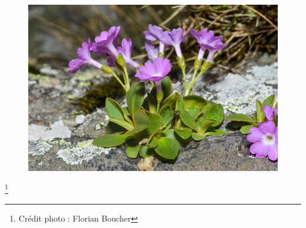 \documentclass[12pt,a4paper,notitlepage]{article}
\begin{document}
\begin{titlepage}
\begin{figure}[h]
\begin{center}
\includegraphics[scale=3]{fig/primulapedemontana_7.jpg}

\end{center}
\end{figure}
\thispagestyle{empty}

{\let\thefootnote\relax\footnote{{Crédit photo : Florian Boucher}}}

\newpage
\begin{abstract} %
\begin{center}

\lipsum[1]

\end{center}
\end{abstract}
\thispagestyle{empty}

\end{titlepage}
\tableofcontents

\newpage
\end{document}
